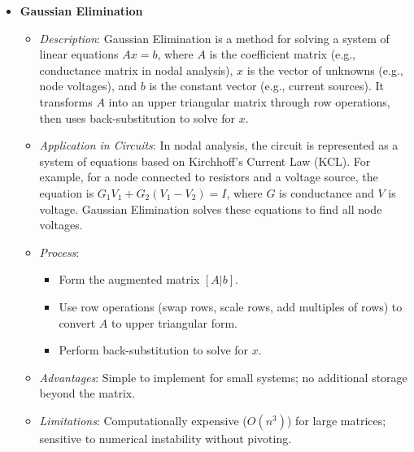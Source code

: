 \documentclass{article}
\begin{document}
\begin{itemize}
    \item \textbf{Gaussian Elimination}
    \begin{itemize}
        \item \textit{Description}: Gaussian Elimination is a method for solving a system of linear equations \( Ax = b \), where \( A \) is the coefficient matrix (e.g., conductance matrix in nodal analysis), \( x \) is the vector of unknowns (e.g., node voltages), and \( b \) is the constant vector (e.g., current sources). It transforms \( A \) into an upper triangular matrix through row operations, then uses back-substitution to solve for \( x \).
        \item \textit{Application in Circuits}: In nodal analysis, the circuit is represented as a system of equations based on Kirchhoff’s Current Law (KCL). For example, for a node connected to resistors and a voltage source, the equation is \( G_1 V_1 + G_2 (V_1 - V_2) = I \), where \( G \) is conductance and \( V \) is voltage. Gaussian Elimination solves these equations to find all node voltages.
        \item \textit{Process}: 
        \begin{itemize}
            \item Form the augmented matrix \( [A | b] \).
            \item Use row operations (swap rows, scale rows, add multiples of rows) to convert \( A \) to upper triangular form.
            \item Perform back-substitution to solve for \( x \).
        \end{itemize}
        \item \textit{Advantages}: Simple to implement for small systems; no additional storage beyond the matrix.
        \item \textit{Limitations}: Computationally expensive (\( O(n^3) \)) for large matrices; sensitive to numerical instability without pivoting.
    \end{itemize}


\end{itemize}
\end{document}

